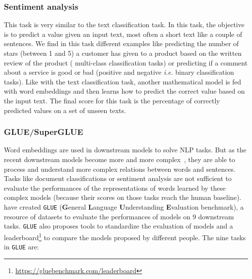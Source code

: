     \subsubsection{Sentiment analysis}
      This task is very similar to the text classification task. In this task,
      the objective is to predict a value given an input text, most often a
      short text like a couple of sentences. We find in this task different
      examples like predicting the number of stars (between 1 and 5) a customer
      has given to a product based on the written review of the product (
      multi-class classification tasks) or predicting if a comment about a
      service is good or bad (positive and negative \textit{i.e.} binary
      classification tasks). Like with the text classification task, another
      mathematical model is fed with word embeddings and then learns how to
      predict the correct value based on the input text. The final score for
      this task is the percentage of correctly predicted values on a set of
      unseen texts.

    \subsubsection{GLUE/SuperGLUE}
      Word embeddings are used in downstream models to solve NLP tasks. But as
      the recent downstream models become more and more
      complex~\citep{peters2018elmo, devlin2019bert}, they are able to process
      and understand more complex relations between words and sentences. Tasks
      like document classifications or sentiment analysis are not sufficient to
      evaluate the performances of the representations of words learned by these
      complex models (because their scores on those tasks reach the human
      baseline).~\citeauthor{wang2018glue}~\citep{wang2018glue} have created
      \texttt{GLUE} (\textbf{G}eneral \textbf{L}anguage \textbf{U}nderstanding
      \textbf{E}valuation benchmark), a resource of datasets to evaluate the
      performances of models on 9 downstream tasks.  \texttt{GLUE} also proposes
      tools to standardize the evaluation of models and a
      leaderboard\footnote{\url{https://gluebenchmark.com/leaderboard}} to
      compare the models proposed by different people. The nine tasks in
      \texttt{GLUE} are:

